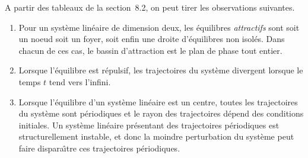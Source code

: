 A partir des tableaux de la section~8.2, on peut tirer les
observations suivantes.
\begin{enumerate}
\item Pour un syst{è}me lin{é}aire de dimension deux, les équilibres {\em
attractifs} sont soit un noeud  soit un foyer, soit enfin une droite d'{é}quilibres non isol{é}s. Dans
chacun de ces cas, le bassin d'attraction est le plan de phase tout entier.
\item Lorsque l'{é}quilibre est r{é}pulsif, les trajectoires du
syst{è}me divergent lorsque le temps $t$ tend vers l'infini.
\item Lorsque l'{é}quilibre d'un syst{è}me lin{é}aire est un centre, toutes
les trajectoires du syst{è}me sont p{é}riodiques et le rayon des 
trajectoires d{é}pend des conditions initiales.
Un syst{è}me lin{é}aire pr{é}sentant des trajectoires p{é}riodiques
est structurellement instable, et donc la moindre perturbation du syst{è}me
peut faire dispara\^ \i tre ces trajectoires p{é}riodiques. 
\end{enumerate}

